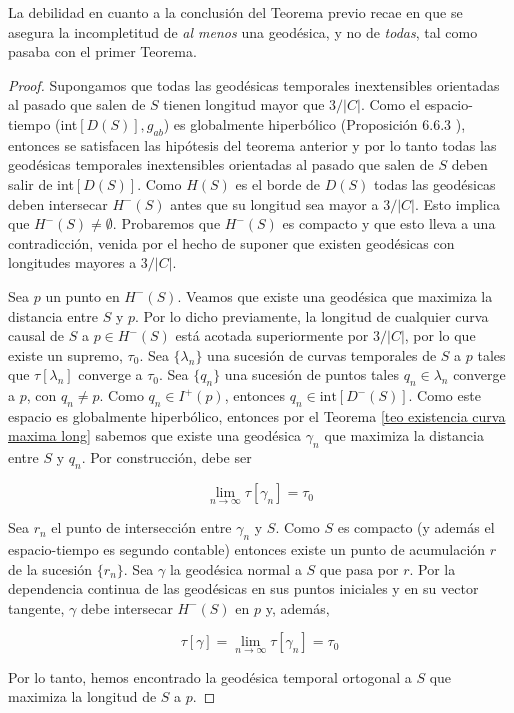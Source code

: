 La debilidad en cuanto a la conclusión del Teorema previo recae en que se asegura la incompletitud de \textit{al menos} una geodésica, y no de \textit{todas}, tal como pasaba con el primer Teorema. 

\begin{proof}
Supongamos que todas las geodésicas temporales inextensibles orientadas al pasado que salen de $S$ tienen longitud mayor que $3/|C|$. Como el espacio-tiempo (int$[D(S)],g_{ab}$) es globalmente hiperbólico (Proposición 6.6.3 \citep{1975lsss.book.....H}), entonces se satisfacen las hipótesis del teorema anterior y por lo tanto todas las geodésicas temporales inextensibles orientadas al pasado que salen de $S$ deben salir de int$[D(S)]$. Como $H(S)$ es el borde de $D(S)$ todas las geodésicas deben intersecar $H^-(S)$ antes que su longitud sea mayor a $3/|C|$. Esto implica que $H^-(S)\neq \emptyset$. Probaremos que $H^-(S)$ es compacto y que esto lleva a una contradicción, venida por el hecho de suponer que existen geodésicas con longitudes mayores a $3/|C|$.

Sea $p$ un punto en $H^-(S)$. Veamos que existe una geodésica que maximiza la distancia entre $S$ y $p$. Por lo dicho previamente, la longitud de cualquier curva causal de $S$ a $p\in H^-(S)$ está acotada superiormente por $3/|C|$, por lo que existe un supremo, $\tau_0$. Sea $\{\lambda_n\}$ una sucesión de curvas temporales de $S$ a $p$ tales que $\tau[\lambda_n]$ converge a $\tau_0$. Sea $\{q_n\}$ una sucesión de puntos tales $q_n\in\lambda_n$ converge a $p$, con $q_n\neq p$. Como $q_n\in I^+(p)$, entonces $q_n\in\text{int}[D^-(S)]$. Como este espacio es globalmente hiperbólico, entonces por el Teorema \ref{teo existencia curva maxima long} sabemos que existe una geodésica $\gamma_n$ que maximiza la distancia entre $S$ y $q_n$. Por construcción, debe ser

\[\lim\limits_{n\to\infty} \tau[\gamma_n]=\tau_0\]

Sea $r_n$ el punto de intersección entre $\gamma_n$ y $S$. Como $S$ es compacto (y además el espacio-tiempo es segundo contable) entonces existe un punto de acumulación $r$ de la sucesión $\{r_n\}$. Sea $\gamma$ la geodésica normal a $S$ que pasa por $r$. Por la dependencia continua de las geodésicas en sus puntos iniciales y en su vector tangente, $\gamma$ debe intersecar $H^-(S)$ en $p$ y, además,

\[ \tau[\gamma]=\lim\limits_{n\to\infty} \tau[\gamma_n]=\tau_0 \]

Por lo tanto, hemos encontrado la geodésica temporal ortogonal a $S$ que maximiza la longitud de $S$ a $p$. 


\end{proof}
